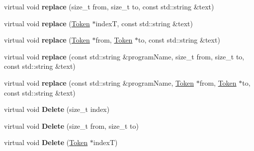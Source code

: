 \begin{DoxyCompactItemize}
\mbox{\label{classantlr4_1_1TokenStreamRewriter_af9024f86e3597239ffb3389938fddd9c}} 
virtual void {\bfseries replace} (size\+\_\+t from, size\+\_\+t to, const std\+::string \&text)
\item 
\mbox{\label{classantlr4_1_1TokenStreamRewriter_aaca7cc8ba05aa0a0580cdf7c59f6ee01}} 
virtual void {\bfseries replace} (\hyperlink{classantlr4_1_1Token}{Token} $\ast$indexT, const std\+::string \&text)
\item 
\mbox{\label{classantlr4_1_1TokenStreamRewriter_a77f3bdda12adf0189edab0ce274a8aab}} 
virtual void {\bfseries replace} (\hyperlink{classantlr4_1_1Token}{Token} $\ast$from, \hyperlink{classantlr4_1_1Token}{Token} $\ast$to, const std\+::string \&text)
\item 
\mbox{\label{classantlr4_1_1TokenStreamRewriter_ae342bfdb7f3490410d74de14639be97c}} 
virtual void {\bfseries replace} (const std\+::string \&program\+Name, size\+\_\+t from, size\+\_\+t to, const std\+::string \&text)
\item 
\mbox{\label{classantlr4_1_1TokenStreamRewriter_a98af0af02cdd4cee8324ce2488cb3db8}} 
virtual void {\bfseries replace} (const std\+::string \&program\+Name, \hyperlink{classantlr4_1_1Token}{Token} $\ast$from, \hyperlink{classantlr4_1_1Token}{Token} $\ast$to, const std\+::string \&text)
\item 
\mbox{\label{classantlr4_1_1TokenStreamRewriter_a02cb3a9155d414c29104c2e4ea94a7a4}} 
virtual void {\bfseries Delete} (size\+\_\+t index)
\item 
\mbox{\label{classantlr4_1_1TokenStreamRewriter_a3e0434d6c68ec9f2c28cba3d1e998a95}} 
virtual void {\bfseries Delete} (size\+\_\+t from, size\+\_\+t to)
\item 
\mbox{\label{classantlr4_1_1TokenStreamRewriter_a7bcb826a61334af379f9ddcc4321a60a}} 
virtual void {\bfseries Delete} (\hyperlink{classantlr4_1_1Token}{Token} $\ast$indexT)
\item 

\end{DoxyCompactItemize}
